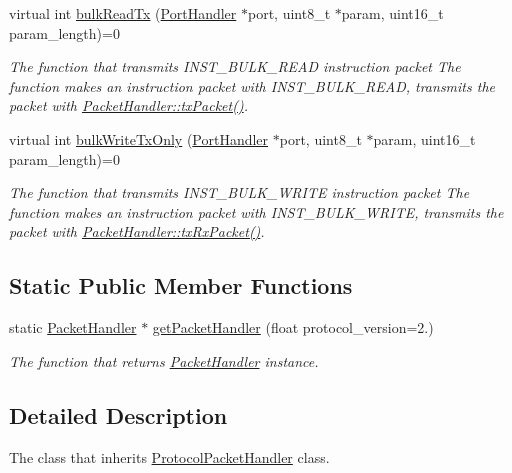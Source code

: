 \begin{DoxyCompactItemize}
virtual int \hyperlink{classmercury_1_1_packet_handler_a88c18487119394e45537098716cbf6af}{bulk\+Read\+Tx} (\hyperlink{classmercury_1_1_port_handler}{Port\+Handler} $\ast$port, uint8\+\_\+t $\ast$param, uint16\+\_\+t param\+\_\+length)=0
\begin{DoxyCompactList}\small\item\em The function that transmits I\+N\+S\+T\+\_\+\+B\+U\+L\+K\+\_\+\+R\+E\+AD instruction packet  The function makes an instruction packet with I\+N\+S\+T\+\_\+\+B\+U\+L\+K\+\_\+\+R\+E\+AD,  transmits the packet with \hyperlink{classmercury_1_1_packet_handler_acc3f84f0d952dc2d827d8500de512abe}{Packet\+Handler\+::tx\+Packet()}. \end{DoxyCompactList}\item 
virtual int \hyperlink{classmercury_1_1_packet_handler_a43bc93f4a1305ae3aea45f67404d8b6d}{bulk\+Write\+Tx\+Only} (\hyperlink{classmercury_1_1_port_handler}{Port\+Handler} $\ast$port, uint8\+\_\+t $\ast$param, uint16\+\_\+t param\+\_\+length)=0
\begin{DoxyCompactList}\small\item\em The function that transmits I\+N\+S\+T\+\_\+\+B\+U\+L\+K\+\_\+\+W\+R\+I\+TE instruction packet  The function makes an instruction packet with I\+N\+S\+T\+\_\+\+B\+U\+L\+K\+\_\+\+W\+R\+I\+TE,  transmits the packet with \hyperlink{classmercury_1_1_packet_handler_ac7ceeaec210827d119199144badaad3a}{Packet\+Handler\+::tx\+Rx\+Packet()}. \end{DoxyCompactList}\end{DoxyCompactItemize}
\subsection*{Static Public Member Functions}
\begin{DoxyCompactItemize}
\item 
static \hyperlink{classmercury_1_1_packet_handler}{Packet\+Handler} $\ast$ \hyperlink{classmercury_1_1_packet_handler_a36eb3799631740032d96d1e0684dc157}{get\+Packet\+Handler} (float protocol\+\_\+version=2.)
\begin{DoxyCompactList}\small\item\em The function that returns \hyperlink{classmercury_1_1_packet_handler}{Packet\+Handler} instance. \end{DoxyCompactList}\end{DoxyCompactItemize}


\subsection{Detailed Description}
The class that inherits \hyperlink{classmercury_1_1_protocol_packet_handler}{Protocol\+Packet\+Handler} class. 


